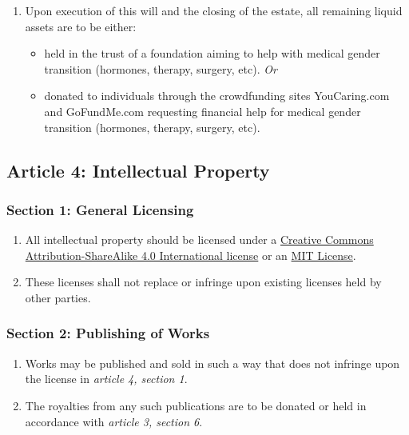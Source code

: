 \begin{enumerate}
\def\labelenumi{\arabic{enumi}.}
\tightlist
\item
  Upon execution of this will and the closing of the estate, all remaining liquid assets are to be either:

  \begin{itemize}
  \tightlist
  \item
    held in the trust of a foundation aiming to help with medical gender transition (hormones, therapy, surgery, etc). \emph{Or}
  \item
    donated to individuals through the crowdfunding sites YouCaring.com and GoFundMe.com requesting financial help for medical gender transition (hormones, therapy, surgery, etc).
  \end{itemize}
\end{enumerate}

\hypertarget{article-4-intellectual-property}{%
\subsection*{Article 4: Intellectual Property}\label{article-4-intellectual-property}}

\hypertarget{section-1-general-licensing}{%
\subsubsection*{Section 1: General Licensing}\label{section-1-general-licensing}}

\begin{enumerate}
\def\labelenumi{\arabic{enumi}.}
\tightlist
\item
  All intellectual property should be licensed under a \href{https://creativecommons.org/licenses/by-sa/4.0/}{Creative Commons Attribution-ShareAlike 4.0 International license} or an \href{https://opensource.org/licenses/MIT}{MIT License}.
\item
  These licenses shall not replace or infringe upon existing licenses held by other parties.
\end{enumerate}

\hypertarget{section-2-publishing-of-works}{%
\subsubsection*{Section 2: Publishing of Works}\label{section-2-publishing-of-works}}

\begin{enumerate}
\def\labelenumi{\arabic{enumi}.}
\tightlist
\item
  Works may be published and sold in such a way that does not infringe upon the license in \emph{article 4, section 1}.
\item
  The royalties from any such publications are to be donated or held in accordance with \emph{article 3, section 6}.
\end{enumerate}

